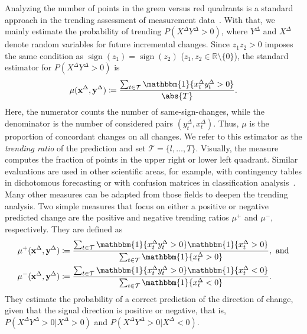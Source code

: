 \documentclass[pdflatex]{sn-jnl}
\theoremstyle{plain}%
\theoremstyle{definition}
\DeclarePairedDelimiter{\abs}\lvert\rvert
\DeclareMathOperator{\sign}{sign}
\newcommand{\ind}[1]{\mathbbm{1}\{#1\}}
\newcommand{\card}[1]{\abs{#1}}
\newcommand{\R}{\mathbb{R}}
\newcommand{\diffx}{\mathbf{x}^{\Delta}}
\newcommand{\diffy}{\mathbf{y}^{\Delta}}
\newcommand{\diffxrv}{X^{\Delta}}
\newcommand{\diffyrv}{Y^{\Delta}}
\newcommand{\diffxt}[1][t]{x^{\Delta}_{#1}}
\newcommand{\diffyt}[1][t]{y^{\Delta}_{#1}}
\newcommand{\acc}{\mu}
\newcommand{\accp}{\acc^+}
\newcommand{\accm}{\acc^-}
\begin{document}
Analyzing the number of points in the green versus red quadrants is a standard approach in the trending assessment of measurement data~\citep{Critchley2010,Saugel2015}.
With that, we mainly estimate the probability of trending $P(\diffxrv \diffyrv > 0)$, where $\diffyrv$ and $\diffxrv$ denote random variables for future incremental changes.
Since $z_1 z_2 > 0$ imposes the same condition as $\sign(z_1) = \sign(z_2)$ ($z_1, z_2 \in \R \setminus \{ 0 \}$), the standard estimator for $P(\diffxrv \diffyrv > 0)$ is
\begin{equation}
    \acc (\diffx, \diffy) \coloneqq \frac{\sum_{t \in \mathcal{T}} \ind{\diffxt \diffyt > 0}}{\card{T}}.\label{eq:acc}
\end{equation}
Here, the numerator counts the number of same-sign-changes, while the denominator is the number of considered pairs $(\diffyt, \diffxt)$.
Thus, $\acc$ is the proportion of concordant changes on all changes.
We refer to this estimator as the \textit{trending ratio} of the prediction and set $\mathcal{T} = \{l, \dots, T\}$.
Visually, the measure computes the fraction of points in the upper right or lower left quadrant.
Similar evaluations are used in other scientific areas, for example, with contingency tables in dichotomous forecasting or with confusion matrices in classification analysis~\citetext{see, e.g., the introductions in \citealt{James2021}, Ch. 4, and \citealp{Jolliffe2012}, Ch. 3}.
Many other measures can be adapted from those fields to deepen the trending analysis.
Two simple measures that focus on either a positive or negative predicted change are the positive and negative trending ratios $\accp$ and $\accm$, respectively.
They are defined as
\begin{align}
    \accp (\diffx, \diffy) &\coloneqq \frac{\sum_{t \in \mathcal{T}} \ind{\diffxt \diffyt > 0} \ind{\diffxt > 0}}{\sum_{t \in \mathcal{T}} \ind{\diffxt > 0}},\ \text{and} \label{eq:accp}\\
    \accm (\diffx, \diffy) &\coloneqq \frac{\sum_{t \in \mathcal{T}} \ind{\diffxt \diffyt > 0} \ind{\diffxt < 0}}{\sum_{t \in \mathcal{T}} \ind{\diffxt < 0}}.\label{eq:accm}
\end{align}
They estimate the probability of a correct prediction of the direction of change, given that the signal direction is positive or negative, that is, $P(\diffxrv \diffyrv > 0 | \diffxrv > 0)$ and $P(\diffxrv \diffyrv > 0 | \diffxrv < 0)$.
\end{document}
